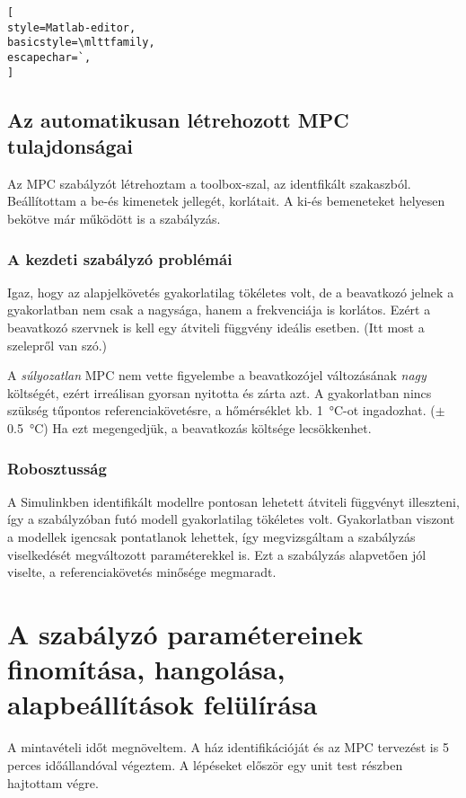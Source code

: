 \begin{lstlisting}[
style=Matlab-editor,
basicstyle=\mlttfamily,
escapechar=`,
]
\end{lstlisting}


\subsection{Az automatikusan létrehozott MPC tulajdonságai}

Az MPC szabályzót létrehoztam a toolbox-szal, az identfikált szakaszból. Beállítottam a be-és kimenetek jellegét, korlátait. A ki-és bemeneteket helyesen bekötve már működött is a szabályzás.



\subsubsection{A kezdeti szabályzó problémái}
Igaz, hogy az alapjelkövetés gyakorlatilag tökéletes volt, de a beavatkozó jelnek a gyakorlatban nem csak a nagysága, hanem a frekvenciája is korlátos. Ezért a beavatkozó szervnek is kell egy átviteli függvény ideális esetben. (Itt most a szelepről van szó.)

A \textit{súlyozatlan} MPC nem vette figyelembe a beavatkozójel változásának \textit{nagy} költségét, ezért irreálisan gyorsan nyitotta és zárta azt.
A gyakorlatban nincs szükség tűpontos referenciakövetésre, a hőmérséklet kb. \SI{1}{\celsius}-ot ingadozhat. ($\pm$ \SI{0.5}{\celsius}) Ha ezt megengedjük, a beavatkozás költsége lecsökkenhet.

\subsubsection{Robosztusság}

A Simulinkben identifikált modellre pontosan lehetett átviteli függvényt illeszteni, így a szabályzóban futó modell gyakorlatilag tökéletes volt. Gyakorlatban viszont a modellek igencsak pontatlanok lehettek, így megvizsgáltam a szabályzás viselkedését megváltozott paraméterekkel is. Ezt a szabályzás alapvetően jól viselte, a referenciakövetés minősége megmaradt.

\section{A szabályzó paramétereinek finomítása, hangolása, alapbeállítások felülírása}

A mintavételi időt megnöveltem. A ház identifikációját és az MPC tervezést is 5 perces időállandóval végeztem. A lépéseket először egy unit test részben hajtottam végre.


